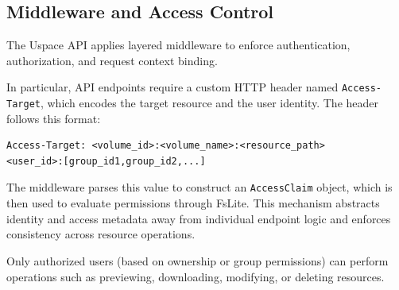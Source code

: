 \begin{table}[H]
\centering
{}
\caption{Uspace Admin API Endpoints}
\label{tab:uspace-admin-endpoints}
\end{table}

\subsection{Middleware and Access Control}

The Uspace API applies layered middleware to enforce authentication, authorization, and request context binding.

In particular, API endpoints require a custom HTTP header named \texttt{Access-Target}, which encodes the target resource and the user identity. The header follows this format:

\begin{verbatim}
Access-Target: <volume_id>:<volume_name>:<resource_path> 
<user_id>:[group_id1,group_id2,...]
\end{verbatim}

The middleware parses this value to construct an \texttt{AccessClaim} object, which is then used to evaluate permissions through FsLite. This mechanism abstracts identity and access metadata away from individual endpoint logic and enforces consistency across resource operations.

Only authorized users (based on ownership or group permissions) can perform operations such as previewing, downloading, modifying, or deleting resources.

